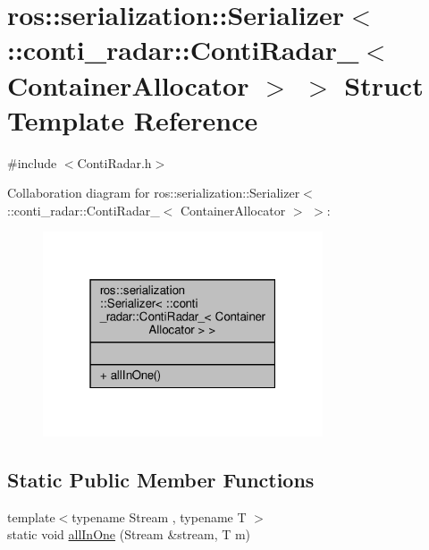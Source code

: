 \hypertarget{structros_1_1serialization_1_1Serializer_3_01_1_1conti__radar_1_1ContiRadar___3_01ContainerAllocator_01_4_01_4}{}\section{ros\+:\+:serialization\+:\+:Serializer$<$ \+:\+:conti\+\_\+radar\+:\+:Conti\+Radar\+\_\+$<$ Container\+Allocator $>$ $>$ Struct Template Reference}
\label{structros_1_1serialization_1_1Serializer_3_01_1_1conti__radar_1_1ContiRadar___3_01ContainerAllocator_01_4_01_4}


{\ttfamily \#include $<$Conti\+Radar.\+h$>$}



Collaboration diagram for ros\+:\+:serialization\+:\+:Serializer$<$ \+:\+:conti\+\_\+radar\+:\+:Conti\+Radar\+\_\+$<$ Container\+Allocator $>$ $>$\+:\nopagebreak
\begin{figure}[H]
\begin{center}
\leavevmode
\includegraphics[width=235pt]{dd/d13/structros_1_1serialization_1_1Serializer_3_01_1_1conti__radar_1_1ContiRadar___3_01ContainerAllocator_01_4_01_4__coll__graph}
\end{center}
\end{figure}
\subsection*{Static Public Member Functions}
\begin{DoxyCompactItemize}
\item 
{\footnotesize template$<$typename Stream , typename T $>$ }\\static void \hyperlink{structros_1_1serialization_1_1Serializer_3_01_1_1conti__radar_1_1ContiRadar___3_01ContainerAllocator_01_4_01_4_a4bcf8b17779549d340ba106e9c3ebf4b}{all\+In\+One} (Stream \&stream, T m)
\end{DoxyCompactItemize}


